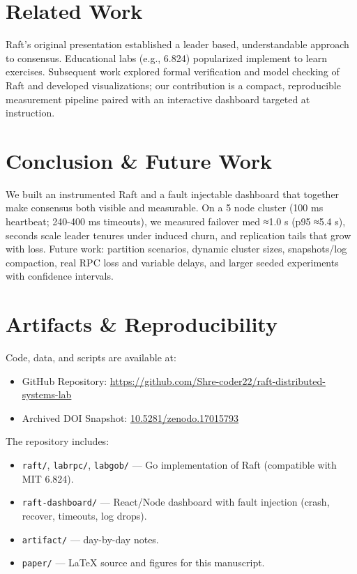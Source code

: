 \documentclass[11pt]{article}
\begin{document}
\section{Related Work}
Raft's original presentation established a leader based, understandable approach to consensus. Educational labs (e.g., 6.824) popularized implement to learn exercises. Subsequent work explored formal verification and model checking of Raft and developed visualizations; our contribution is a compact, reproducible measurement pipeline paired with an interactive dashboard targeted at instruction.

\section{Conclusion \& Future Work}
We built an instrumented Raft and a fault injectable dashboard that together make consensus both visible and measurable. On a 5 node cluster (100 ms heartbeat; 240-400 ms timeouts), we measured failover med ≈1.0 s (p95 ≈5.4 s), seconds scale leader tenures under induced churn, and replication tails that grow with loss. Future work: partition scenarios, dynamic cluster sizes, snapshots/log compaction, real RPC loss and variable delays, and larger seeded experiments with confidence intervals.

\section*{Artifacts \& Reproducibility}

Code, data, and scripts are available at:  
\begin{itemize}
  \item GitHub Repository: \url{https://github.com/Shre-coder22/raft-distributed-systems-lab}
  \item Archived DOI Snapshot: \href{https://doi.org/10.5281/zenodo.17015793}{10.5281/zenodo.17015793}
\end{itemize} 

The repository includes:
\begin{itemize}
  \item \texttt{raft/}, \texttt{labrpc/}, \texttt{labgob/} — Go implementation of Raft (compatible with MIT 6.824).
  \item \texttt{raft-dashboard/} — React/Node dashboard with fault injection (crash, recover, timeouts, log drops).
  \item \texttt{artifact/} — day-by-day notes.
  \item \texttt{paper/} — LaTeX source and figures for this manuscript.
\end{itemize}
\end{document}
